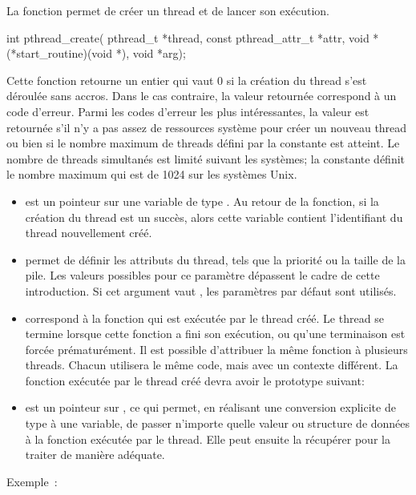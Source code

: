 \label{func:pthread_create}
La fonction  permet de créer un thread et de lancer son exécution.
\begin{codeblock}
int pthread_create(
    pthread_t *thread,
    const pthread_attr_t *attr,
    void *(*start_routine)(void *),
    void *arg);
\end{codeblock}

Cette fonction retourne un entier qui vaut 0 si la création du thread s'est déroulée sans accros. Dans le cas contraire, la valeur retournée correspond à un code d'erreur.
Parmi les codes d'erreur les plus intéressantes, la valeur  est retournée s'il n'y a pas assez de ressources système pour créer un nouveau thread ou bien si le nombre maximum de threads défini par la constante  est atteint. Le nombre de threads simultanés est limité suivant les systèmes; la constante  définit le nombre maximum qui est de 1024 sur les systèmes Unix.
\begin{itemize}
\item{} est un pointeur sur une variable de type . Au retour de la fonction, si la création du thread est un succès, alors cette variable contient l'identifiant du thread nouvellement créé.

\item{} permet de définir les attributs du thread, tels que la priorité ou la taille de la pile. Les valeurs possibles pour ce paramètre dépassent le cadre de cette introduction. Si cet argument vaut , les paramètres par défaut sont utilisés.

\item{} correspond à la fonction qui est exécutée par le thread créé. Le thread se termine lorsque cette fonction a fini son exécution, ou qu'une terminaison est forcée prématurément. Il est possible d'attribuer la même fonction à plusieurs threads. Chacun utilisera le même code, mais avec un contexte différent. La fonction exécutée par le thread créé devra avoir le prototype suivant:

\hspace{1cm}

\item{} est un pointeur sur , ce qui permet, en réalisant une conversion explicite de type à une variable, de passer n'importe quelle valeur ou structure de données à la fonction exécutée par le thread. Elle peut ensuite la récupérer pour la traiter de manière adéquate.
\end{itemize}
Exemple~:

